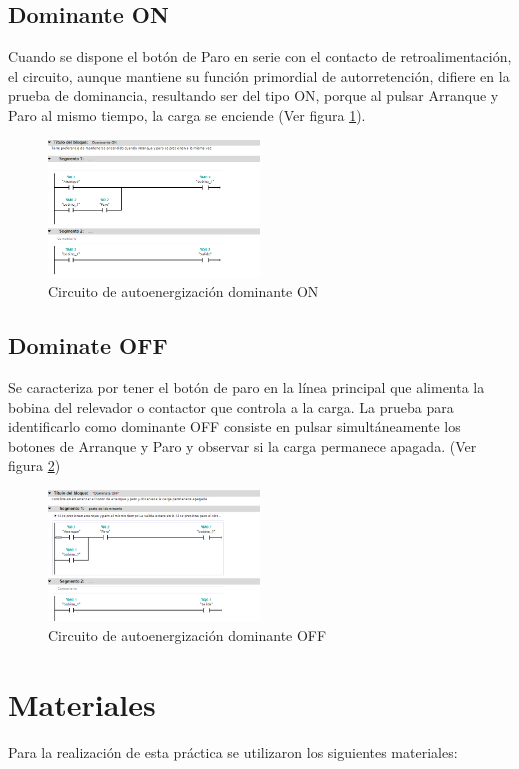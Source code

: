 \documentclass[12pt]{report}
\begin{document}
\subsection{Dominante ON}
Cuando se dispone el botón de Paro en serie con el contacto de retroalimentación, el circuito, aunque mantiene su función primordial de autorretención, difiere en la prueba de dominancia, resultando ser del tipo ON, porque al pulsar Arranque y Paro al mismo tiempo, la carga se enciende (Ver figura \ref{fig:dominante_on}).
\begin{figure}[H]
    \centering
    \includegraphics[width=0.5\textwidth]{screenshots/Dominato ON.png}
    \caption{Circuito de autoenergización dominante ON}
    \label{fig:dominante_on}
\end{figure}
\subsection{Dominate OFF}
Se caracteriza por tener el botón de paro en la línea principal que alimenta la bobina del relevador o contactor que controla a la carga. La prueba para identificarlo como dominante OFF consiste en pulsar simultáneamente los botones de Arranque y Paro y observar si la carga permanece apagada. (Ver figura \ref{fig:dominante_off})
\begin{figure}[H]
    \centering
    \includegraphics[width=0.5\textwidth]{screenshots/Dominante OFF.png}
    \caption{Circuito de autoenergización dominante OFF}
    \label{fig:dominante_off}
\end{figure}

\section{Materiales}
Para la realización de esta práctica se utilizaron los siguientes materiales:
\end{document}

